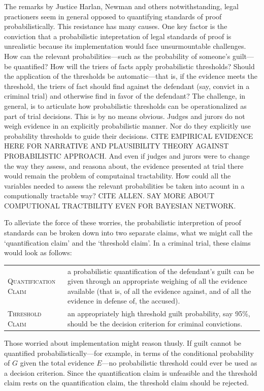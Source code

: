 \documentclass[10pt,dvipsnames,enabledeprecatedfontcommands]{scrartcl}
\begin{document}
The remarks by Justice Harlan, Newman and others notwithstanding, legal
practioners seem in general opposed to quantifying standards of proof
probabilistically. This resistance has many causes. One key factor is
the conviction that a probabilistic intepretation of legal standards of
proof is unrealistic because its implementation would face
unsurmountable challenges. How can the relevant probabilities---such as
the probability of someone's guilt---be quantified? How will the triers
of facts apply probabilistic thresholds? Should the application of the
thresholds be automatic---that is, if the evidence meets the threshold,
the triers of fact should find against the defendant (say, convict in a
criminal trial) and otherwise find in favor of the defendant? The
challenge, in general, is to articulate how probabilistic thresholds can
be operationalized as part of trial decisions. This is by no means
obvious. Judges and jurors do not weigh evidence in an explicitly
probabilistic manner. Nor do they explicitly use probability thresholds
to guide their decisions. CITE EMPIRICAL EVIDENCE HERE FOR NARRATIVE AND
PLAUSIBILITY THEORY AGAINST PROBABILISTIC APPROACH. And even if judges
and jurors were to change the way they assess, and reasona about, the
evidence presented at trial there would remain the problem of
computainal tractability. How could all the variables needed to assess
the relevant probabilities be taken into acount in a computionally
tractable way? CITE ALLEN. SAY MORE ABOUT COMPUTIONAL TRACTBILITY EVEN
FOR BAYESIAN NETWORK.

To alleviate the force of these worries, the probabilistic interpretion
of proof standards can be broken down into two separate claims, what we
might call the `quantification claim' and the `threshold claim'. In a
criminal trial, these claims would look as follows:

\begin{tabular}{lp{8.5cm}}
 \textsc{Quantification Claim} & a probabilistic quantification of the defendant's guilt can 
 be given through an appropriate weighing of all the evidence available (that is, of all the evidence against, and of all the evidence in defense of, the accused).\\
 \textsc{Threshold Claim} & an appropriately high threshold guilt probability, say 95\%, 
 should be the decision criterion for criminal convictions.
  \end{tabular}

\noindent Those worried about implementation might reason thusly. If
guilt cannot be quantified probabilistically---for example, in terms of
the conditional probability of \(G\) given the total evidence \(E\)---no
probabilistic threshold could ever be used as a decision criterion.
Since the quantification claim is unfeasible and the threshold claim
rests on the quantification claim, the threshold claim should be
rejected.
\end{document}
